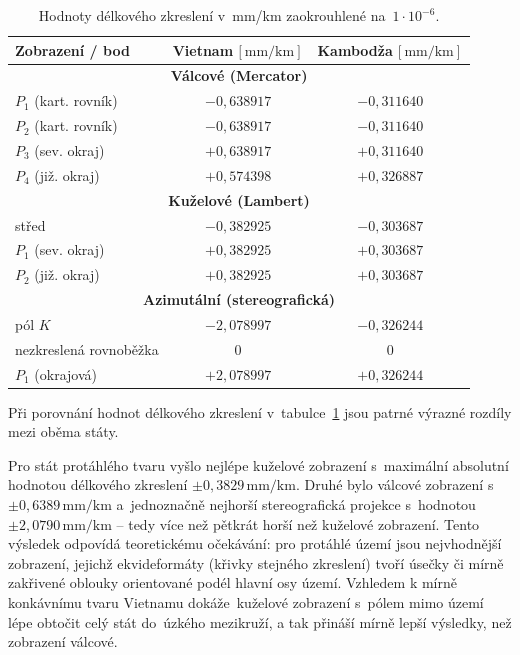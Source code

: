 \documentclass[11pt, a4paper]{article}
\begin{document}
\begin{table}[h!]
\centering
\begin{tabular}{l|c|c}
\toprule
\textbf{Zobrazení / bod} & \textbf{Vietnam}\,$[\textrm{mm/km}]$ & \textbf{Kambodža}\,$[\textrm{mm/km}]$ \\
\midrule
\multicolumn{3}{c}{\textbf{Válcové (Mercator)}} \\
\midrule
$P_1$ (kart. rovník)        & $-0{,}638917$ & $-0{,}311640$ \\
$P_2$ (kart. rovník)        & $-0{,}638917$ & $-0{,}311640$ \\
$P_3$ (sev. okraj)          & $+0{,}638917$ & $+0{,}311640$ \\
$P_4$ (již. okraj)          & $+0{,}574398$ & $+0{,}326887$ \\
\midrule
\multicolumn{3}{c}{\textbf{Kuželové (Lambert)}} \\
\midrule
střed                       & $-0{,}382925$ & $-0{,}303687$ \\
$P_1$ (sev. okraj)          & $+0{,}382925$ & $+0{,}303687$ \\
$P_2$ (již. okraj)          & $+0{,}382925$ & $+0{,}303687$ \\
\midrule
\multicolumn{3}{c}{\textbf{Azimutální (stereografická)}} \\
\midrule
pól $K$                     & $-2{,}078997$ & $-0{,}326244$ \\
nezkreslená rovnoběžka      & $0$           & $0$           \\
$P_1$ (okrajová)            & $+2{,}078997$ & $+0{,}326244$ \\
\bottomrule
\end{tabular}
\caption{Hodnoty délkového zkreslení v~mm/km zaokrouhlené na~$1\cdot 10^{-6}$.}
\label{tab:vysledky}
\end{table}

\clearpage

Při porovnání hodnot délkového zkreslení v~tabulce~\ref{tab:vysledky} jsou patrné výrazné rozdíly mezi oběma státy.

Pro stát protáhlého tvaru vyšlo nejlépe kuželové zobrazení s~maximální absolutní hodnotou délkového zkreslení $\pm 0{,}3829\,\textrm{mm/km}$. Druhé bylo válcové zobrazení s $\pm 0{,}6389\,\textrm{mm/km}$ a~jednoznačně nejhorší stereografická projekce s~hodnotou $\pm 2{,}0790\,\textrm{mm/km}$ -- tedy více než pětkrát horší než kuželové zobrazení. Tento výsledek odpovídá teoretickému očekávání: pro protáhlé území jsou nejvhodnější zobrazení, jejichž ekvideformáty (křivky stejného zkreslení) tvoří úsečky či mírně zakřivené oblouky orientované podél hlavní osy území. Vzhledem k mírně konkávnímu tvaru Vietnamu dokáže~kuželové zobrazení s~pólem mimo území lépe obtočit celý stát do~úzkého mezikruží, a tak přináší mírně lepší výsledky, než zobrazení válcové.
\end{document}
